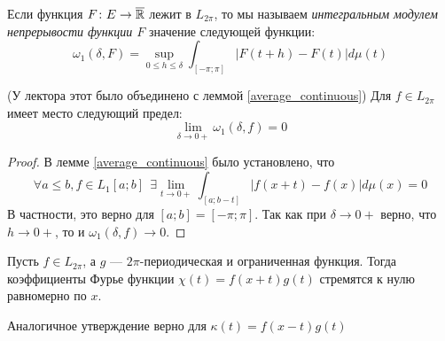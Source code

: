 \begin{definition}
	Если функция $F \colon E \to \overline{\mathbb{R}}$ лежит в $L_{2\pi}$, то мы называем \textit{интегральным модулем непрерывости функции $F$} значение следующей функции:
	\[
		\omega_1(\delta, F) = \sup_{0 \le h \le \delta} \int_{[-\pi; \pi]} |F(t + h) - F(t)|d\mu(t)
	\]
\end{definition}

\begin{lemma} (У лектора этот было объединено с леммой \ref{average_continuous})
	Для $f \in L_{2\pi}$ имеет место следующий предел:
	\[
		\lim_{\delta \to 0+} \omega_1(\delta, f) = 0
	\]
\end{lemma}

\begin{proof}
	В лемме \ref{average_continuous} было установлено, что
	\[
		\forall a \le b, f \in L_1[a; b]\ \ \exists \lim_{t \to 0+} \int_{[a; b - t]} |f(x + t) - f(x)|d\mu(x) = 0
	\]
	В частности, это верно для $[a; b] = [-\pi; \pi]$. Так как при $\delta \to 0+$ верно, что $h \to 0+$, то и $\omega_1(\delta, f) \to 0$.
\end{proof}

\begin{lemma} \label{uniconv_lemma}
	Пусть $f \in L_{2\pi}$, а $g$ --- $2\pi$-периодическая и ограниченная функция. Тогда коэффициенты Фурье функции $\chi(t) = f(x + t)g(t)$ стремятся к нулю равномерно по $x$.
\end{lemma}

\begin{note}
	Аналогичное утверждение верно для $\kappa(t) = f(x - t)g(t)$
\end{note}

